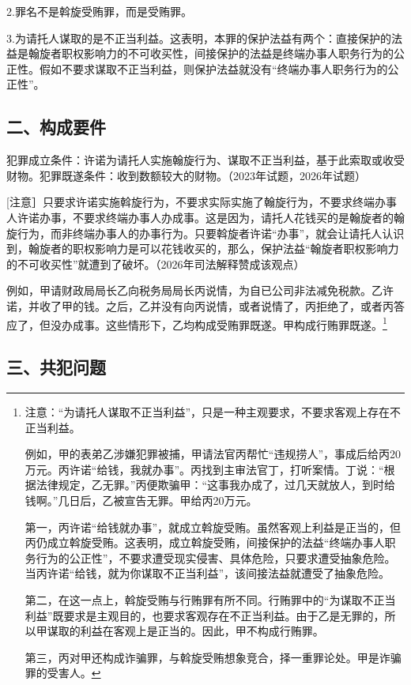 2.罪名不是斡旋受贿罪，而是受贿罪。

3.为请托人谋取的是不正当利益。这表明，本罪的保护法益有两个：直接保护的法益是翰旋者职权影响力的不可收买性，间接保护的法益是终端办事人职务行为的公正性。假如不要求谋取不正当利益，则保护法益就没有“终端办事人职务行为的公正性”。

\subsection*{二、构成要件}

犯罪成立条件：许诺为请托人实施翰旋行为、谋取不正当利益，基于此索取或收受财物。犯罪既遂条件：收到数额较大的财物。（2023年试题，2026年试题）

[注意］只要求许诺实施斡旋行为，不要求实际实施了翰旋行为，不要求终端办事人许诺办事，不要求终端办事人办成事。这是因为，请托人花钱买的是翰旋者的翰旋行为，而非终端办事人的办事行为。只要斡旋者许诺“办事”，就会让请托人认识到，翰旋者的职权影响力是可以花钱收买的，那么，保护法益“翰旋者职权影响力的不可收买性”就遭到了破坏。（2026年司法解释赞成该观点）

例如，甲请财政局局长乙向税务局局长丙说情，为自已公司非法减免税款。乙许诺，并收了甲的钱。之后，乙并没有向丙说情，或者说情了，丙拒绝了，或者丙答应了，但没办成事。这些情形下，乙均构成受贿罪既遂。甲构成行贿罪既遂。\footnote{注意：“为请托人谋取不正当利益”，只是一种主观要求，不要求客观上存在不正当利益。

例如，甲的表弟乙涉嫌犯罪被捕，甲请法官丙帮忙“违规捞人”，事成后给丙20万元。丙许诺“给钱，我就办事”。丙找到主审法官丁，打听案情。丁说：“根据法律规定，乙无罪。”丙便欺骗甲：“这事我办成了，过几天就放人，到时给钱啊。”几日后，乙被宣告无罪。甲给丙20万元。

第一，丙许诺“给钱就办事”，就成立斡旋受贿。虽然客观上利益是正当的，但丙仍成立斡旋受贿。这表明，成立斡旋受贿，间接保护的法益“终端办事人职务行为的公正性”，不要求遭受现实侵害、具体危险，只要求遭受抽象危险。当丙许诺“给钱，就为你谋取不正当利益”，该间接法益就遭受了抽象危险。

第二，在这一点上，斡旋受贿与行贿罪有所不同。行贿罪中的“为谋取不正当利益”既要求是主观目的，也要求客观存在不正当利益。由于乙是无罪的，所以甲谋取的利益在客观上是正当的。因此，甲不构成行贿罪。

第三，丙对甲还构成诈骗罪，与斡旋受贿想象竞合，择一重罪论处。甲是诈骗罪的受害人。}

\subsection*{三、共犯问题}

